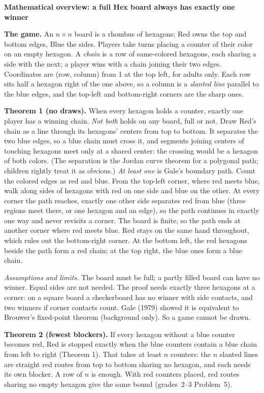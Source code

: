 \documentclass[11pt]{article}
\newcommand{\head}[1]{\par\textbf{\large #1}\par\nopagebreak}
\newcommand{\x}{\ensuremath{\times}}
\begin{document}
\head{Mathematical overview: a full Hex board always has exactly one winner}
\textbf{The game.} An $n\x n$ board is a rhombus of hexagons; Red owns the top and bottom edges, Blue the sides. Players take turns placing a counter of their color on an empty hexagon. A \emph{chain} is a row of same-colored hexagons, each sharing a side with the next; a player wins with a chain joining their two edges. Coordinates are (row, column) from 1 at the top left, for adults only. Each row sits half a hexagon right of the one above, so a column is a \emph{slanted line} parallel to the blue edges, and the top-left and bottom-right corners are the sharp ones.

\textbf{Theorem 1 (no draws).} When every hexagon holds a counter, exactly one player has a winning chain. \emph{Not both} holds on any board, full or not. Draw Red's chain as a line through its hexagons' centers from top to bottom. It separates the two blue edges, so a blue chain must cross it, and segments joining centers of touching hexagons meet only at a shared center: the crossing would be a hexagon of both colors. (The separation is the Jordan curve theorem for a polygonal path; children rightly treat it as obvious.) \emph{At least one} is Gale's boundary path. Count the colored edges as red and blue. From the top-left corner, where red meets blue, walk along sides of hexagons with red on one side and blue on the other. At every corner the path reaches, exactly one other side separates red from blue (three regions meet there, or one hexagon and an edge), so the path continues in exactly one way and never revisits a corner. The board is finite, so the path ends at another corner where red meets blue. Red stays on the same hand throughout, which rules out the bottom-right corner. At the bottom left, the red hexagons beside the path form a red chain; at the top right, the blue ones form a blue chain.

\emph{Assumptions and limits.} The board must be full; a partly filled board can have no winner. Equal sides are not needed. The proof needs exactly three hexagons at a corner: on a square board a checkerboard has no winner with side contacts, and two winners if corner contacts count. Gale (1979) showed it is equivalent to Brouwer's fixed-point theorem (background only). So a game cannot be drawn.

\textbf{Theorem 2 (fewest blockers).} If every hexagon without a blue counter becomes red, Red is stopped exactly when the blue counters contain a blue chain from left to right (Theorem 1). That takes at least $n$ counters: the $n$ slanted lines are straight red routes from top to bottom sharing no hexagon, and each needs its own blocker. A row of $n$ is enough. With red counters placed, red routes sharing no empty hexagon give the same bound (grades~2--3 Problem~5).
\end{document}
